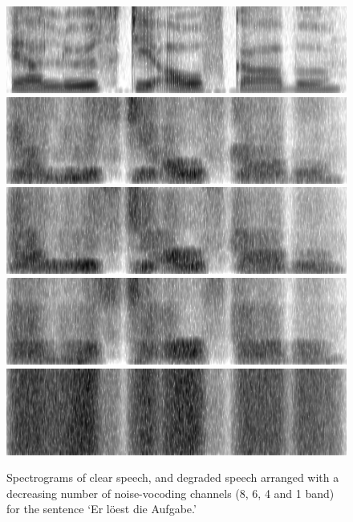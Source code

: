 \documentclass[a4paper, nobind]{templates/ociamthesis}
\begin{document}
\begin{figure}[!htpb]

{\centering \includegraphics[width=0.9\linewidth]{figures/materials/aufgabe_clear} \includegraphics[width=0.9\linewidth]{figures/materials/aufgabe_8bands} \includegraphics[width=0.9\linewidth]{figures/materials/aufgabe_6bands} \includegraphics[width=0.9\linewidth]{figures/materials/aufgabe_4bands} \includegraphics[width=0.9\linewidth]{figures/materials/aufgabe_1band} 

}

\caption{Spectrograms of clear speech, and degraded speech arranged with a decreasing number of noise-vocoding channels (8, 6, 4 and 1 band) for the sentence `Er löest die Aufgabe.' }\label{fig:vocoding-spectrogram}
\end{figure}
\end{document}
